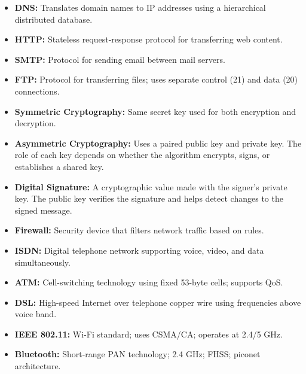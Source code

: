 \documentclass[12pt,a4paper]{article}
\begin{document}
\begin{tcolorbox}[defbox, title={\textbf{One-Line Definitions}}, title after break={One-Line Definitions (contd.)}]
\begin{itemize}[leftmargin=*, itemsep=3pt, topsep=0pt]
  \item \textbf{DNS:} Translates domain names to IP addresses using a hierarchical distributed database.
  \item \textbf{HTTP:} Stateless request-response protocol for transferring web content.
  \item \textbf{SMTP:} Protocol for sending email between mail servers.
  \item \textbf{FTP:} Protocol for transferring files; uses separate control (21) and data (20) connections.
  \item \textbf{Symmetric Cryptography:} Same secret key used for both encryption and decryption.
  \item \textbf{Asymmetric Cryptography:} Uses a paired public key and private key. The role of each key depends on whether the algorithm encrypts, signs, or establishes a shared key.
  \item \textbf{Digital Signature:} A cryptographic value made with the signer's private key. The public key verifies the signature and helps detect changes to the signed message.
  \item \textbf{Firewall:} Security device that filters network traffic based on rules.
  \item \textbf{ISDN:} Digital telephone network supporting voice, video, and data simultaneously.
  \item \textbf{ATM:} Cell-switching technology using fixed 53-byte cells; supports QoS.
  \item \textbf{DSL:} High-speed Internet over telephone copper wire using frequencies above voice band.
  \item \textbf{IEEE 802.11:} Wi-Fi standard; uses CSMA/CA; operates at 2.4/5 GHz.
  \item \textbf{Bluetooth:} Short-range PAN technology; 2.4 GHz; FHSS; piconet architecture.
\end{itemize}
\end{tcolorbox}

\vspace{6pt}
\end{document}
